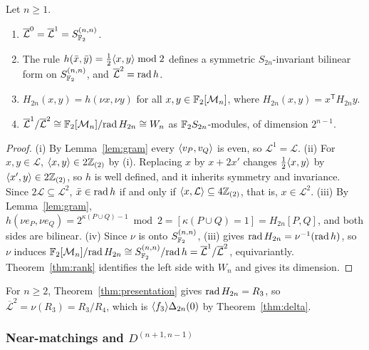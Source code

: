 \begin{theorem}\label{thm:step3}
Let $n\ge1$.
\begin{enumerate}
\item $\overline{\mathcal L}^0=\overline{\mathcal L}^1=S^{(n,n)}_{\mathbb{F}_2}$.
\item The rule $h(\bar x,\bar y)=\tfrac12\langle x,y\rangle\bmod2$ defines a symmetric $S_{2n}$-invariant bilinear form on $S^{(n,n)}_{\mathbb{F}_2}$, and $\overline{\mathcal L}^2=\operatorname{rad} h$.
\item $H_{2n}(x,y)=h(\nu x,\nu y)$ for all $x,y\in\mathbb{F}_2[\mathcal{M}_n]$, where $H_{2n}(x,y)=x^{\mathsf T}H_{2n}y$.
\item $\overline{\mathcal L}^1/\overline{\mathcal L}^2\cong\mathbb{F}_2[\mathcal{M}_n]/{\operatorname{rad} H_{2n}}\cong W_n$ as $\mathbb{F}_2 S_{2n}$-modules, of dimension $2^{n-1}$.
\end{enumerate}
\end{theorem}

\begin{proof}
(i) By Lemma~\ref{lem:gram} every $\langle v_P,v_Q\rangle$ is even, so $\mathcal L^1=\mathcal L$. (ii) For $x,y\in\mathcal L$, $\langle x,y\rangle\in2\mathbb{Z}_{(2)}$ by (i). Replacing $x$ by $x+2x'$ changes $\tfrac12\langle x,y\rangle$ by $\langle x',y\rangle\in2\mathbb{Z}_{(2)}$, so $h$ is well defined, and it inherits symmetry and invariance. Since $2\mathcal L\subseteq\mathcal L^2$, $\bar x\in\operatorname{rad} h$ if and only if $\langle x,\mathcal L\rangle\subseteq4\mathbb{Z}_{(2)}$, that is, $x\in\mathcal L^2$. (iii) By Lemma~\ref{lem:gram}, $h(\nu e_P,\nu e_Q)=2^{\kappa(P\cup Q)-1}\bmod2=[\kappa(P\cup Q)=1]=H_{2n}[P,Q]$, and both sides are bilinear. (iv) Since $\nu$ is onto $S^{(n,n)}_{\mathbb{F}_2}$, (iii) gives $\operatorname{rad} H_{2n}=\nu^{-1}(\operatorname{rad} h)$, so $\nu$ induces $\mathbb{F}_2[\mathcal{M}_n]/{\operatorname{rad} H_{2n}}\cong S^{(n,n)}_{\mathbb{F}_2}/{\operatorname{rad} h}=\overline{\mathcal L}^1/\overline{\mathcal L}^2$, equivariantly. Theorem~\ref{thm:rank} identifies the left side with $W_n$ and gives its dimension.
\end{proof}

For $n\ge2$, Theorem~\ref{thm:presentation} gives $\operatorname{rad} H_{2n}=R_3$, so $\overline{\mathcal L}^2=\nu(R_3)=R_3/R_4$, which is $\langle f_3\rangle\Delta_{2n}(0)$ by Theorem~\ref{thm:delta}.

\subsubsection{Near-matchings and \texorpdfstring{$D^{(n+1,n-1)}$}{D\textasciicircum(n+1,n-1)}}\label{subsubsec:nearmatch}


